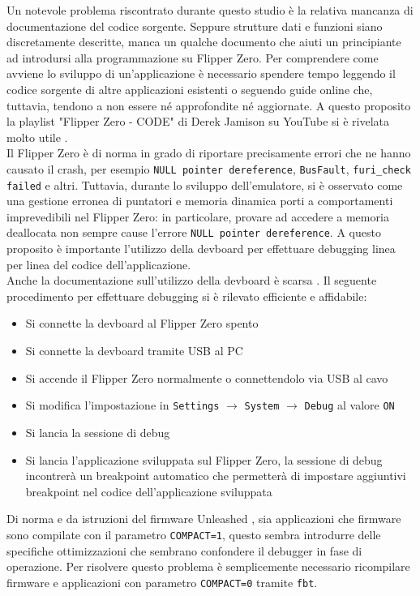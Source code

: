 Un notevole problema riscontrato durante questo studio è la relativa mancanza di documentazione del codice sorgente. Seppure strutture dati e funzioni siano discretamente descritte, manca un qualche documento che aiuti un principiante ad introdursi alla programmazione su Flipper Zero. Per comprendere come avviene lo sviluppo di un'applicazione è necessario spendere tempo leggendo il codice sorgente di altre applicazioni esistenti o seguendo guide online che, tuttavia, tendono a non essere né approfondite né aggiornate. A questo proposito la playlist "Flipper Zero - CODE" di Derek Jamison su YouTube si è rivelata molto utile \cite{derek}.\\
Il Flipper Zero è di norma in grado di riportare precisamente errori che ne hanno causato il crash, per esempio \texttt{NULL pointer dereference}, \texttt{BusFault}, \texttt{furi\_check failed} e altri. Tuttavia, durante lo sviluppo dell'emulatore, si è osservato come una gestione erronea di puntatori e memoria dinamica porti a comportamenti imprevedibili nel Flipper Zero: in particolare, provare ad accedere a memoria deallocata non sempre cause l'errore \texttt{NULL pointer dereference}. A questo proposito è importante l'utilizzo della devboard per effettuare debugging linea per linea del codice dell'applicazione.\\
Anche la documentazione sull'utilizzo della devboard è scarsa \cite{devboard}. Il seguente procedimento per effettuare debugging si è rilevato efficiente e affidabile:
\begin{itemize}
  \item Si connette la devboard al Flipper Zero spento
  \item Si connette la devboard tramite USB al PC
  \item Si accende il Flipper Zero normalmente o connettendolo via USB al cavo
  \item Si modifica l'impostazione in \texttt{Settings} \(\rightarrow\) \texttt{System} \(\rightarrow\) \texttt{Debug} al valore \texttt{ON}
  \item Si lancia la sessione di debug
  \item Si lancia l'applicazione sviluppata sul Flipper Zero, la sessione di debug incontrerà un breakpoint automatico che permetterà di impostare aggiuntivi breakpoint nel codice dell'applicazione sviluppata
\end{itemize}
Di norma e da istruzioni del firmware Unleashed \cite{firmware}, sia applicazioni che firmware sono compilate con il parametro \texttt{COMPACT=1}, questo sembra introdurre delle specifiche ottimizzazioni che sembrano confondere il debugger in fase di operazione. Per risolvere questo problema è semplicemente necessario ricompilare firmware e applicazioni con parametro \texttt{COMPACT=0} tramite \texttt{fbt}.
